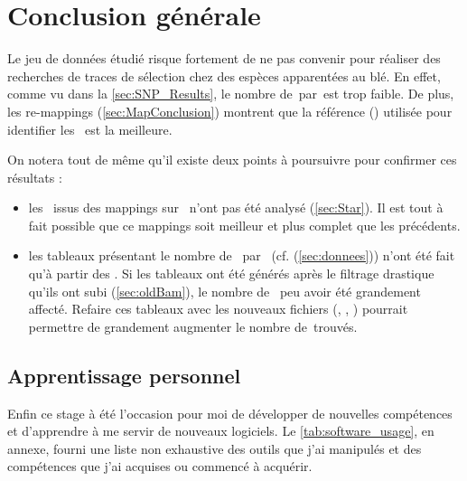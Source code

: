 \documentclass[../main]{subfiles} %
\begin{document}
\addto\extrasfrench{\protected\edef:{\unexpanded\expandafter{:}}}

\section{Conclusion générale}

Le jeu de données étudié risque fortement de ne pas convenir pour réaliser des recherches de traces de sélection chez des espèces apparentées au blé. En effet, comme vu dans la \cref{sec:SNP_Results}, le nombre de \SNP\,par \contig\,est trop faible. De plus, les re-\glspl{mapping} (\cref{sec:MapConclusion}) montrent que la référence (\TrEx) utilisée pour identifier les \SNP est la meilleure. 

On notera tout de même qu'il existe deux points à poursuivre pour confirmer ces résultats :

\begin{itemize}
    \item les \bam issus des \glspl{mapping} sur \GeMo n'ont pas été analysé (\cref{sec:Star}). Il est tout à fait possible que ce \glspl{mapping} soit meilleur et plus complet que les précédents.

    \item les tableaux présentant le nombre de \SNP par \contig (cf. (\cref{sec:donnees})) n'ont été fait qu'à partir des \OldBam. Si les tableaux ont été générés après le filtrage drastique qu'ils ont subi (\cref{sec:oldBam}), le nombre de \SNP peu avoir été grandement affecté. Refaire ces tableaux avec les nouveaux fichiers (\BamGeStar, \BamTrEx, \BamTrMo) pourrait permettre de grandement augmenter le nombre de \SNP\,trouvés.
\end{itemize}

\subsection{Apprentissage personnel}
Enfin ce stage à été l'occasion pour moi de développer de nouvelles compétences et d'apprendre à me servir de nouveaux logiciels. Le \cref{tab:software_usage}, en annexe, fourni une liste non exhaustive des outils que j'ai manipulés et des compétences que j'ai acquises ou commencé à acquérir.






\end{document}
